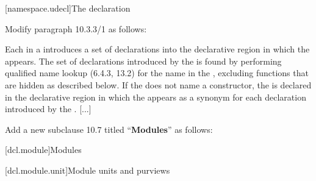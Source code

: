 \begin{undecided}
\setcounter{subsection}{2}
[namespace.udecl]{The  declaration}

Modify paragraph 10.3.3/1 as follows:
\begin{std.txt}
  \resetalinea[0]
  \alinea
  Each  in a 
  introduces a set of declarations  into the declarative 
  region in which the
   appears.  The set of declarations
   introduced by
  the  is found by performing qualified name
  lookup (6.4.3, 13.2) for the name in the ,
  excluding functions that are hidden as described below.  If the
   does not name a constructor, the 
   is declared in the declarative region in which
  the  appears as a synonym for each
  declaration  
  introduced by the . [...]
\end{std.txt}
\end{undecided}

\noindent
Add a new subclause 10.7 titled ``\textbf{Modules}'' as follows:

\setcounter{section}{6}
[dcl.module]{Modules}%

[dcl.module.unit]{Module units and purviews}

